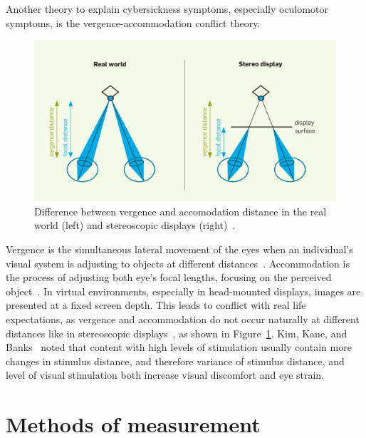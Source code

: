Another theory to explain cybersickness symptoms, especially oculomotor symptoms, is the \mbox{vergence-accommodation}
conflict theory.
\begin{figure}[h]
    \centering
    \includegraphics[width=\textwidth/2]{content/2_related_work/img/VergenceAccommodation[Kroeker2010]}
    \caption{Difference between vergence and accomodation distance in the real world (left) and stereoscopic displays
        (right)~\cite{Kroeker2010}.}
    \label{fig:vergence-accommodation-differences}
\end{figure}
Vergence is the simultaneous lateral movement of the eyes when an individual's visual system is adjusting to objects
at different distances~\cite{Kim2014}.
Accommodation is the process of adjusting both eye's focal lengths, focusing on the perceived
object~\cite{Rebenitsch2016}.
In virtual environments, especially in head-mounted displays, images are presented at a fixed screen depth.
This leads to conflict with real life expectations, as vergence and accommodation do not occur naturally at
different distances like in stereoscopic displays~\cite{Saredakis2020}, as shown in
Figure~\ref{fig:vergence-accommodation-differences}.
Kim, Kane, and Banks~\cite{Kim2014} noted that content with high levels of stimulation usually contain more changes
in stimulus distance, and therefore variance of stimulus distance, and level of visual stimulation both increase visual
discomfort and eye strain.


\section{Methods of measurement}\label{sec:methods-of-measurement}

